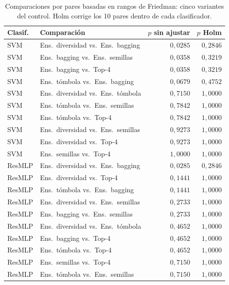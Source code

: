 \begin{table}[H]
\centering\fontsize{8}{10}\selectfont\setlength{\tabcolsep}{3.0pt}
\caption{Comparaciones por pares basadas en rangos de Friedman: cinco variantes del control. Holm corrige los 10 pares dentro de cada clasificador.}
\label{tab:sel-control-holm}
\begin{tabular}{@{}llrr@{}}
\toprule
Clasif. & Comparación & $p$ sin ajustar & $p$ Holm \\
\midrule
SVM & Ens.\ diversidad vs.\ Ens.\ bagging & $0{,}0285$ & $0{,}2846$ \\
SVM & Ens.\ bagging vs.\ Ens.\ semillas & $0{,}0358$ & $0{,}3219$ \\
SVM & Ens.\ bagging vs.\ Top-4 & $0{,}0358$ & $0{,}3219$ \\
SVM & Ens.\ tómbola vs.\ Ens.\ bagging & $0{,}0679$ & $0{,}4752$ \\
SVM & Ens.\ diversidad vs.\ Ens.\ tómbola & $0{,}7150$ & $1{,}0000$ \\
SVM & Ens.\ tómbola vs.\ Ens.\ semillas & $0{,}7842$ & $1{,}0000$ \\
SVM & Ens.\ tómbola vs.\ Top-4 & $0{,}7842$ & $1{,}0000$ \\
SVM & Ens.\ diversidad vs.\ Ens.\ semillas & $0{,}9273$ & $1{,}0000$ \\
SVM & Ens.\ diversidad vs.\ Top-4 & $0{,}9273$ & $1{,}0000$ \\
SVM & Ens.\ semillas vs.\ Top-4 & $1{,}0000$ & $1{,}0000$ \\
ResMLP & Ens.\ diversidad vs.\ Ens.\ bagging & $0{,}0285$ & $0{,}2846$ \\
ResMLP & Ens.\ diversidad vs.\ Top-4 & $0{,}1441$ & $1{,}0000$ \\
ResMLP & Ens.\ tómbola vs.\ Ens.\ bagging & $0{,}1441$ & $1{,}0000$ \\
ResMLP & Ens.\ diversidad vs.\ Ens.\ semillas & $0{,}2733$ & $1{,}0000$ \\
ResMLP & Ens.\ bagging vs.\ Ens.\ semillas & $0{,}2733$ & $1{,}0000$ \\
ResMLP & Ens.\ diversidad vs.\ Ens.\ tómbola & $0{,}4652$ & $1{,}0000$ \\
ResMLP & Ens.\ bagging vs.\ Top-4 & $0{,}4652$ & $1{,}0000$ \\
ResMLP & Ens.\ tómbola vs.\ Top-4 & $0{,}4652$ & $1{,}0000$ \\
ResMLP & Ens.\ semillas vs.\ Top-4 & $0{,}7150$ & $1{,}0000$ \\
ResMLP & Ens.\ tómbola vs.\ Ens.\ semillas & $0{,}7150$ & $1{,}0000$ \\
\bottomrule
\end{tabular}
\end{table}
